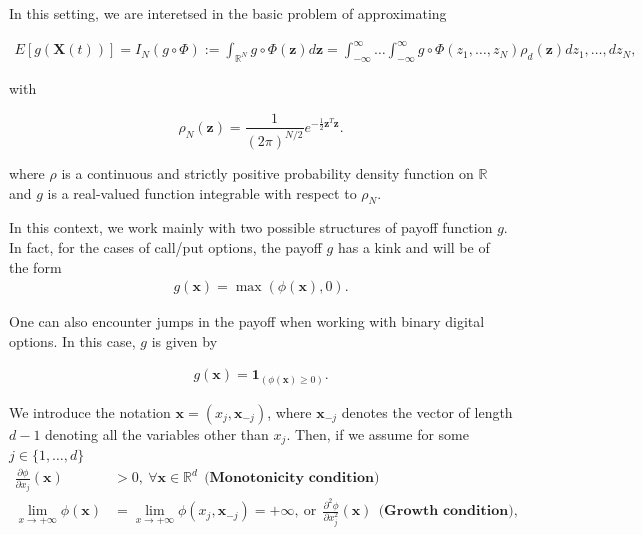 \documentclass[11pt]{article}
\newcommand{\rset}{\mathbb{R}}
\newcommand{\PERIOD}{.}
\newcommand{\COMMA}{,}
\begin{document}
In this setting, we are interetsed in the basic problem of approximating

\begin{align}\label{eq:multivariate integral}
E[g(\mathbf{X}(t))]=I_N (g \circ \Phi) :=\int_{\rset^N}g \circ \Phi(\mathbf{z})	d \mathbf{z}= \int_{-\infty}^{\infty} \dots \int_{-\infty}^{\infty} g \circ \Phi(z_1,\dots,z_N) \rho_d(\mathbf{z}) dz_1,\dots,dz_N \COMMA
\end{align}


with

\begin{equation}\label{eq: multivariate gaussian distribution}
\rho_N(\mathbf{z})=\frac{1}{(2 \pi)^{N/2}} e^{-\frac{1}{2} \mathbf{z}^T \mathbf{z}} \PERIOD
\end{equation} 

where $\rho$ is a continuous and strictly positive probability density function on $\rset$ and $g$ is a real-valued function integrable with respect to $\rho_N$.
 
In this context, we work mainly with two possible structures of payoff function $g$. In fact, for the cases of call/put options, the payoff $g$ has a kink and  will be of the form 
\begin{align}\label{eq:payoffs_with_kink}
g(\mathbf{x})=\max(\phi(\mathbf{x}),0).
\end{align}

One can also encounter jumps in the payoff when working with binary digital options. In this case, $g$ is given by 


\begin{align}\label{eq:payoffs_with_jump}
	g(\mathbf{x})=\mathbf{1}_{(\phi(\mathbf{x}) \ge 0)}.
\end{align}


We introduce the notation $\mathbf{x}=(x_j,\mathbf{x}_{-j})$, where $\mathbf{x}_{-j}$ denotes the vector of length $d-1$ denoting all the variables other than $x_j$. Then, if we assume for some $j \in \{1,\dots,d\}$
\begin{align}
	\frac{\partial \phi}{\partial x_j}(\mathbf{x}) &>0,\: \forall \mathbf{x} \in \rset^d \: \: \textbf{(Monotonicity condition)}  \label{assump:Monotonicity condition}\\
	\underset{x \rightarrow +\infty}{\lim} \phi(\mathbf{x})&=\underset{x \rightarrow +\infty}{\lim} \phi(x_j,\mathbf{x}_{-j})=+\infty, \: \text{or} \:\: \frac{\partial^2 \phi} {\partial x_j^2}(\mathbf{x}) \: \: \textbf{(Growth condition)}  \label{assump:Growth condition} \COMMA
\end{align}
\end{document}

